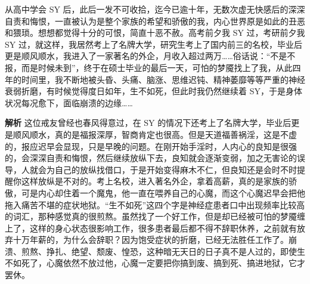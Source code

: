 \begin{case}[神经衰弱]
    从高中学会 SY 后，此后一发不可收拾，迄今已逾十年，无数次虚无快感后的深深自责和悔恨，一直被认为是整个家族的希望和骄傲的我，内心世界原是如此的丑恶和猥琐。想想都觉得十分的可恨，简直十恶不赦。高考前夕我 SY 过，考研前夕我 SY 过，就这样，我居然考上了名牌大学，研究生考上了国内前三的名校，毕业后更是顺风顺水，我进入了一家著名的外企，月收入超过两万……俗话说：“不是不报，而是时候未到”，终于在硕士毕业的最后一天，可怕的梦魇找上了我，从此四年的时间里，我不断地被头昏、头痛、脑涨、思维迟钝、精神萎靡等等严重的神经衰弱折磨，有时候觉得度日如年，生不如死，但此时我仍然继续着 SY，于是身体状况每况愈下，面临崩溃的边缘……

    \textbf{解析} 这位戒友曾经也春风得意过，在 SY 的情况下还考上了名牌大学，毕业后更是顺风顺水，真的是福报深厚，智商肯定也很高。但是天道福善祸淫，这是不虚的，报应迟早会显现，只是早晚的问题。在刚开始手淫时，人内心的良知是很强的，会深深自责和悔恨，然后继续放纵下去，良知就会逐渐变弱，加之无害论的误导，人就会为自己的放纵找借口，于是开始变得麻木不仁，但良知还是会时不时提醒你这样放纵是不对的。考上名校，进入著名外企，拿着高薪，真的是家族的骄傲，可是内心却住着一个魔鬼，他一直在喂养自己的心魔，而这个心魔迟早会把他拖入痛苦不堪的症状地狱。“生不如死”这四个字是神经症患者口中出现频率比较高的词汇，那种感觉真的很煎熬。虽然找了一个好工作，但是却已经被可怕的梦魇缠上了，这样的身心状态很影响工作，很多患者最后都不得不辞职休养，之前就有放弃十万年薪的，为什么会辞职？因为饱受症状的折磨，已经无法胜任工作了。崩溃、煎熬、挣扎、绝望、颓废、惶恐，这种暗无天日的日子真不是人过的，即使生不如死了，心魔依然不放过他，心魔一定要把你搞到废、搞到死、搞进地狱，它才罢休。
\end{case}

